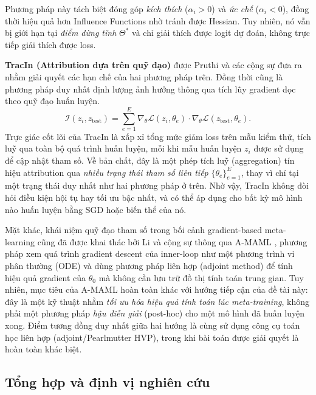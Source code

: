 Phương pháp này tách biệt đóng góp \emph{kích thích} ($\alpha_i > 0$) và \emph{ức chế} ($\alpha_i < 0$), đồng thời hiệu quả hơn Influence Functions nhờ tránh được Hessian. Tuy nhiên, nó vẫn bị giới hạn tại \emph{điểm dừng tĩnh} $\Theta^*$ và chỉ giải thích được logit dự đoán, không trực tiếp giải thích được loss.

\textbf{TracIn (Attribution dựa trên quỹ đạo)} được Pruthi và các cộng sự \cite{pruthi2020estimating} đưa ra nhằm giải quyết các hạn chế của hai phương pháp trên. Đồng thời cũng là phương pháp duy nhất định lượng ảnh hưởng thông qua tích lũy gradient dọc theo quỹ đạo huấn luyện.
\begin{equation}
\mathcal{I}(z_i, z_{\text{test}}) = \sum_{e=1}^{E} \nabla_{\theta} \mathcal{L}(z_i, \theta_e) \cdot \nabla_{\theta} \mathcal{L}(z_{\text{test}}, \theta_e).
\label{eq:trajectory_attribution}
\end{equation}
Trực giác cốt lõi của TracIn là xấp xỉ tổng mức giảm loss trên mẫu kiểm thử, tích luỹ qua toàn bộ quá trình huấn luyện, mỗi khi mẫu huấn luyện $z_i$ được sử dụng để cập nhật tham số. Về bản chất, đây là một phép tích luỹ (aggregation) tín hiệu attribution qua \emph{nhiều trạng thái tham số liên tiếp} $\{\theta_e\}_{e=1}^{E}$, thay vì chỉ tại một trạng thái duy nhất như hai phương pháp ở trên. Nhờ vậy, TracIn không đòi hỏi điều kiện hội tụ hay tối ưu bậc nhất, và có thể áp dụng cho bất kỳ mô hình nào huấn luyện bằng SGD hoặc biến thể của nó.

Mặt khác, khái niệm quỹ đạo tham số trong bối cảnh gradient-based meta-learning cũng đã được khai thác bởi Li và cộng sự thông qua A-MAML \cite{li2023adjointmaml}, phương pháp xem quá trình gradient descent của inner-loop như một phương trình vi phân thường (ODE) và dùng phương pháp liên hợp (adjoint method) để tính hiệu quả gradient của $\theta_0$ mà không cần lưu trữ đồ thị tính toán trung gian. Tuy nhiên, mục tiêu của A-MAML hoàn toàn khác với hướng tiếp cận của đề tài này: đây là một kỹ thuật nhằm \emph{tối ưu hóa hiệu quả tính toán lúc meta-training}, không phải một phương pháp \emph{hậu diễn giải} (post-hoc) cho một mô hình đã huấn luyện xong. Điểm tương đồng duy nhất giữa hai hướng là cùng sử dụng công cụ toán học liên hợp (adjoint/Pearlmutter HVP), trong khi bài toán được giải quyết là hoàn toàn khác biệt.

\subsection{Tổng hợp và định vị nghiên cứu}
\label{subsec:relatedwork_synthesis}

